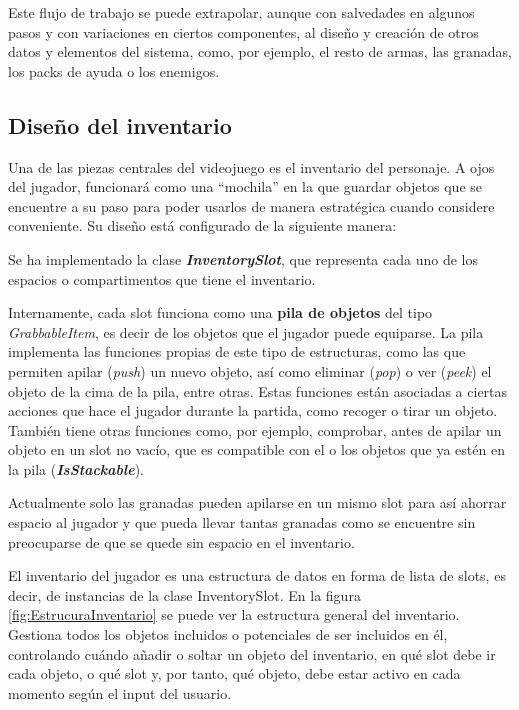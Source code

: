 Este flujo de trabajo se puede extrapolar, aunque con salvedades en algunos pasos y con variaciones en ciertos componentes, al diseño y creación de otros datos y elementos del sistema, como, por ejemplo, el resto de armas, las granadas, los packs de ayuda o los enemigos.

\subsection{Diseño del inventario}
Una de las piezas centrales del videojuego es el inventario del personaje. A ojos del jugador, funcionará como una “mochila” en la que guardar objetos que se encuentre a su paso para poder usarlos de manera estratégica cuando considere conveniente.
Su diseño está configurado de la siguiente manera:

Se ha implementado la clase \textbf{\textit{InventorySlot}}, que representa cada uno de los espacios o compartimentos que tiene el inventario.

Internamente, cada slot funciona como una \textbf{pila de objetos} del tipo \textit{GrabbableItem}, es decir de los objetos que el jugador puede equiparse. La pila implementa las funciones propias de este tipo de estructuras, como las que permiten apilar (\textit{push}) un nuevo objeto, así como eliminar (\textit{pop}) o ver (\textit{peek}) el objeto de la cima de la pila, entre otras. Estas funciones están asociadas a ciertas acciones que hace el jugador durante la partida, como recoger o tirar un objeto.\\
También tiene otras funciones como, por ejemplo, comprobar, antes de apilar un objeto en un slot no vacío, que es compatible con el o los objetos que ya estén en la pila (\textbf{\textit{IsStackable}}).

Actualmente solo las granadas pueden apilarse en un mismo slot para así ahorrar espacio al jugador y que pueda llevar tantas granadas como se encuentre sin preocuparse de que se quede sin espacio en el inventario.

El inventario del jugador es una estructura de datos en forma de lista de slots, es decir, de instancias de la clase InventorySlot. En la figura \ref{fig:EstrucuraInventario} se puede ver la estructura general del inventario. Gestiona todos los objetos incluidos o potenciales de ser incluidos en él, controlando cuándo añadir o soltar un objeto del inventario, en qué slot debe ir cada objeto, o qué slot y, por tanto, qué objeto, debe estar activo en cada momento según el input del usuario.

